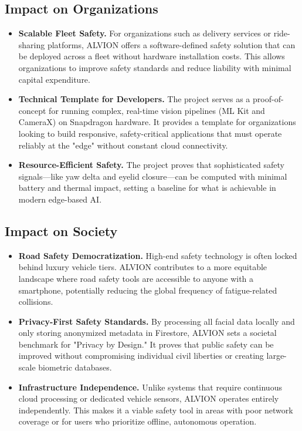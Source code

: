 \documentclass[11pt]{report}
\begin{document}
\subsection*{Impact on Organizations}
\begin{itemize}
    \item \textbf{Scalable Fleet Safety.} For organizations such as delivery services or ride-sharing platforms, ALVION offers a software-defined safety solution that can be deployed across a fleet without hardware installation costs. This allows organizations to improve safety standards and reduce liability with minimal capital expenditure.
    \item \textbf{Technical Template for Developers.} The project serves as a proof-of-concept for running complex, real-time vision pipelines (ML Kit and CameraX) on Snapdragon hardware. It provides a template for organizations looking to build responsive, safety-critical applications that must operate reliably at the "edge" without constant cloud connectivity.
    \item \textbf{Resource-Efficient Safety.} The project proves that sophisticated safety signals—like yaw delta and eyelid closure—can be computed with minimal battery and thermal impact, setting a baseline for what is achievable in modern edge-based AI.
\end{itemize}

\subsection*{Impact on Society}
\begin{itemize}
    \item \textbf{Road Safety Democratization.} High-end safety technology is often locked behind luxury vehicle tiers. ALVION contributes to a more equitable landscape where road safety tools are accessible to anyone with a smartphone, potentially reducing the global frequency of fatigue-related collisions.
    \item \textbf{Privacy-First Safety Standards.} By processing all facial data locally and only storing anonymized metadata in Firestore, ALVION sets a societal benchmark for "Privacy by Design." It proves that public safety can be improved without compromising individual civil liberties or creating large-scale biometric databases.
    \item \textbf{Infrastructure Independence.} Unlike systems that require continuous cloud processing or dedicated vehicle sensors, ALVION operates entirely independently. This makes it a viable safety tool in areas with poor network coverage or for users who prioritize offline, autonomous operation.
\end{itemize}
\end{document}
